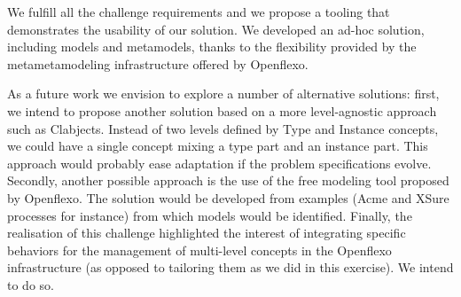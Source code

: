 

We fulfill all the challenge requirements and we propose a tooling that demonstrates the usability of our solution.  We developed an ad-hoc solution, including models and metamodels, thanks to the flexibility provided by the metametamodeling infrastructure offered by Openflexo.

As a future work we envision to explore a number of alternative solutions: first, we intend to propose another solution based on a more level-agnostic approach such as Clabjects. Instead of two levels defined by Type and Instance concepts, we could have a single concept mixing a type part and an instance part. This approach would probably ease adaptation if the problem specifications evolve. Secondly, another possible approach is the use of the free modeling tool proposed by Openflexo. The solution would be developed from examples (Acme and XSure processes for instance) from which models would be identified. Finally, the realisation of this challenge highlighted the interest of integrating specific behaviors for the management of multi-level concepts in the Openflexo infrastructure (as opposed to tailoring them as we did in this exercise). We intend to do so.